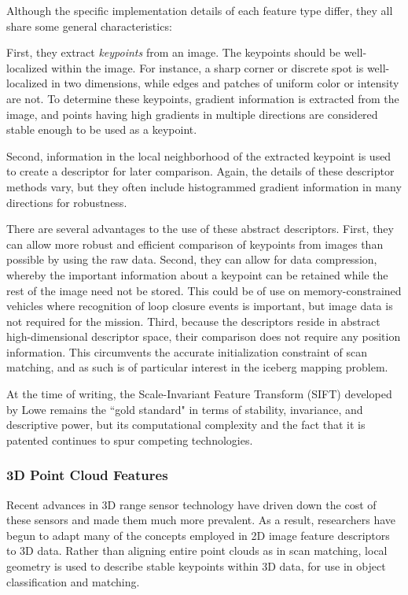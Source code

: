 Although the specific implementation details of each feature type differ, they all share some general characteristics:

First, they extract \emph{keypoints} from an image. The keypoints should be well-localized within the image. For instance, a sharp corner or discrete spot is well-localized in two dimensions, while edges and patches of uniform color or intensity are not. To determine these keypoints, gradient information is extracted from the image, and points having high gradients in multiple directions are considered stable enough to be used as a keypoint. 

Second, information in the local neighborhood of the extracted keypoint is used to create a descriptor for later comparison. Again, the details of these descriptor methods vary, but they often include histogrammed gradient information in many directions for robustness. 

There are several advantages to the use of these abstract descriptors. First, they can allow more robust and efficient comparison of keypoints from images than possible by using the raw data. Second, they can allow for data compression, whereby the important information about a keypoint can be retained while the rest of the image need not be stored. This could be of use on memory-constrained vehicles where recognition of loop closure events is important, but image data is not required for the mission. Third, because the descriptors reside in abstract high-dimensional descriptor space, their comparison does not require any position information. This circumvents the accurate initialization constraint of scan matching, and as such is of particular interest in the iceberg mapping problem.

At the time of writing, the Scale-Invariant Feature Transform (SIFT) developed by Lowe \cite{Lowe2004} remains the ``gold standard" in terms of stability, invariance, and descriptive power, but its computational complexity and the fact that it is patented continues to spur competing technologies.

\subsubsection{3D Point Cloud Features}

Recent advances in 3D range sensor technology have driven down the cost of these sensors and made them much more prevalent. As a result, researchers have begun to adapt many of the concepts employed in 2D image feature descriptors to 3D data. Rather than aligning entire point clouds as in scan matching, local geometry is used to describe stable keypoints within 3D data, for use in object classification and matching. 

